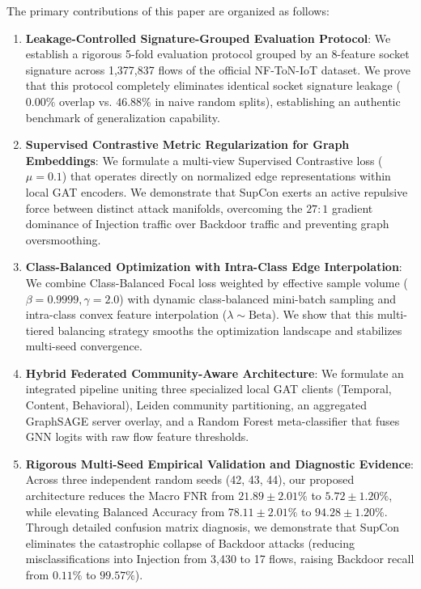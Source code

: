 \documentclass[journal,onecolumn]{IEEEtran}
\begin{document}
The primary contributions of this paper are organized as follows:
\begin{enumerate}
    \item \textbf{Leakage-Controlled Signature-Grouped Evaluation Protocol}: We establish a rigorous 5-fold evaluation protocol grouped by an 8-feature socket signature across 1,377,837 flows of the official NF-ToN-IoT dataset. We prove that this protocol completely eliminates identical socket signature leakage ($0.00\%$ overlap vs. $46.88\%$ in naive random splits), establishing an authentic benchmark of generalization capability.
    \item \textbf{Supervised Contrastive Metric Regularization for Graph Embeddings}: We formulate a multi-view Supervised Contrastive loss ($\mu = 0.1$) that operates directly on normalized edge representations within local GAT encoders. We demonstrate that SupCon exerts an active repulsive force between distinct attack manifolds, overcoming the $27:1$ gradient dominance of Injection traffic over Backdoor traffic and preventing graph oversmoothing.
    \item \textbf{Class-Balanced Optimization with Intra-Class Edge Interpolation}: We combine Class-Balanced Focal loss weighted by effective sample volume ($\beta = 0.9999, \gamma = 2.0$) with dynamic class-balanced mini-batch sampling and intra-class convex feature interpolation ($\lambda \sim \text{Beta}$). We show that this multi-tiered balancing strategy smooths the optimization landscape and stabilizes multi-seed convergence.
    \item \textbf{Hybrid Federated Community-Aware Architecture}: We formulate an integrated pipeline uniting three specialized local GAT clients (Temporal, Content, Behavioral), Leiden community partitioning, an aggregated GraphSAGE server overlay, and a Random Forest meta-classifier that fuses GNN logits with raw flow feature thresholds.
    \item \textbf{Rigorous Multi-Seed Empirical Validation and Diagnostic Evidence}: Across three independent random seeds (42, 43, 44), our proposed architecture reduces the Macro FNR from $21.89 \pm 2.01\%$ to $5.72 \pm 1.20\%$, while elevating Balanced Accuracy from $78.11 \pm 2.01\%$ to $94.28 \pm 1.20\%$. Through detailed confusion matrix diagnosis, we demonstrate that SupCon eliminates the catastrophic collapse of Backdoor attacks (reducing misclassifications into Injection from 3,430 to 17 flows, raising Backdoor recall from $0.11\%$ to $99.57\%$).
\end{enumerate}
\end{document}
